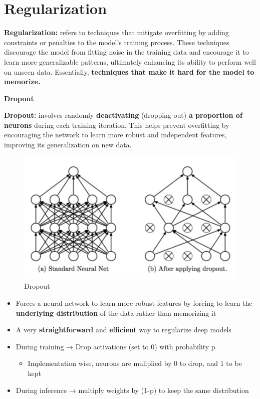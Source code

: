 \section{Regularization}

\begin{definition}
    \textbf{Regularization:} refers to techniques that mitigate overfitting by adding constraints or penalties to the model's training process. These techniques discourage the model from fitting noise in the training data and encourage it to learn more generalizable patterns, ultimately enhancing its ability to perform well on unseen data. Essentially, \textbf{techniques that make it hard for the model to memorize.}
\end{definition}

\textbf{Dropout}

\begin{definition}
    \textbf{Dropout:}  involves randomly \textbf{deactivating} (dropping out) \textbf{a proportion of neurons} during each training iteration. This helps prevent overfitting by encouraging the network to learn more robust and independent features, improving its generalization on new data.
\end{definition}

\begin{figure}[h!t]
    \centering
    \includegraphics[width=0.5\linewidth]{dropout.png}
    \caption{Dropout}
    \label{fig:enter-label}
\end{figure}
\begin{itemize}
    \item Forces a neural network to learn more robust features by forcing to learn the \textbf{underlying distribution} of the data rather than memorizing it
    \item A very \textbf{straightforward} and \textbf{efficient} way to regularize deep models
    \item During training → Drop activations (set to 0) with probability p
    \begin{itemize}
        \item Implementation wise, neurons are muliplied by 0 to drop, and 1 to be kept
    \end{itemize}
    \item During inference → multiply weights by (1-p) to keep the same distribution
\end{itemize}

